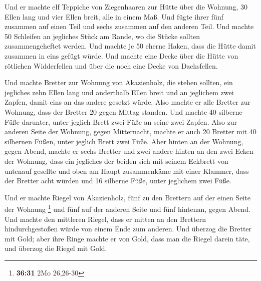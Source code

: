  Und er machte elf Teppiche von Ziegenhaaren zur Hütte
über die Wohnung,  30 Ellen lang und vier Ellen breit,
alle in einem Maß.  Und fügte ihrer fünf zusammen auf
einen Teil und sechs zusammen auf den anderen Teil.  Und
machte 50 Schleifen an jegliches Stück am Rande, wo die Stücke sollten
zusammengeheftet werden.  Und machte je 50 eherne Haken,
dass die Hütte damit zusammen in eins gefügt würde.  Und
machte eine Decke über die Hütte von rötlichen Widderfellen und über die
noch eine Decke von Dachsfellen.

 Und machte Bretter zur Wohnung von Akazienholz, die
stehen sollten,  ein jegliches zehn Ellen lang und
anderthalb Ellen breit  und an jeglichem zwei Zapfen,
damit eins an das andere gesetzt würde. Also machte er alle Bretter zur
Wohnung,  dass der Bretter 20 gegen Mittag standen.
 Und machte 40 silberne Füße darunter, unter jeglich
Brett zwei Füße an seine zwei Zapfen.  Also zur anderen
Seite der Wohnung, gegen Mitternacht, machte er auch 20 Bretter
 mit 40 silbernen Füßen, unter jeglich Brett zwei Füße.
 Aber hinten an der Wohnung, gegen Abend, machte er sechs
Bretter  und zwei andere hinten an den zwei Ecken der
Wohnung,  dass ein jegliches der beiden sich mit seinem
Eckbrett von untenauf gesellte und oben am Haupt zusammenkäme mit einer
Klammer,  dass der Bretter acht würden und 16 silberne
Füße, unter jeglichem zwei Füße.

 Und er machte Riegel von Akazienholz, fünf zu den
Brettern auf der einen Seite der Wohnung \footnote{\textbf{36:31} 2Mo
  26,26-30}  und fünf auf der anderen Seite und fünf
hintenan, gegen Abend.  Und machte den mittleren Riegel,
dass er mitten an den Brettern hindurchgestoßen würde von einem Ende zum
anderen.  Und überzog die Bretter mit Gold; aber ihre
Ringe machte er von Gold, dass man die Riegel darein täte, und überzog
die Riegel mit Gold.

